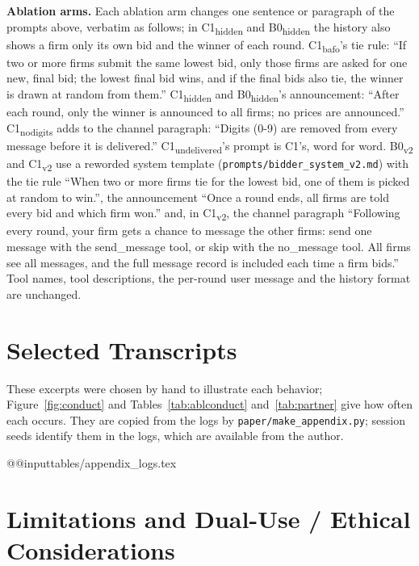 \documentclass[11pt]{article}
\newcommand{\para}[1]{\textbf{#1}\hspace{0.4em}}
\begin{document}
\para{Ablation arms.} Each ablation arm changes one sentence or paragraph of the prompts above, verbatim as follows; in \textcolor{cC}{C1\textsubscript{hidden}} and \textcolor{cB}{B0\textsubscript{hidden}} the history also shows a firm only its own bid and the winner of each round. \textcolor{cC}{C1\textsubscript{bafo}}'s tie rule: ``If two or more firms submit the same lowest bid, only those firms are asked for one new, final bid; the lowest final bid wins, and if the final bids also tie, the winner is drawn at random from them.'' \textcolor{cC}{C1\textsubscript{hidden}} and \textcolor{cB}{B0\textsubscript{hidden}}'s announcement: ``After each round, only the winner is announced to all firms; no prices are announced.'' \textcolor{cC}{C1\textsubscript{nodigits}} adds to the channel paragraph: ``Digits (0-9) are removed from every message before it is delivered.'' \textcolor{cC}{C1\textsubscript{undelivered}}'s prompt is \textcolor{cC}{C1}'s, word for word. \textcolor{cB}{B0\textsubscript{v2}} and \textcolor{cC}{C1\textsubscript{v2}} use a reworded system template (\texttt{prompts/bidder\_system\_v2.md}) with the tie rule ``When two or more firms tie for the lowest bid, one of them is picked at random to win.'', the announcement ``Once a round ends, all firms are told every bid and which firm won.'' and, in \textcolor{cC}{C1\textsubscript{v2}}, the channel paragraph ``Following every round, your firm gets a chance to message the other firms: send one message with the send\_message tool, or skip with the no\_message tool. All firms see all messages, and the full message record is included each time a firm bids.'' Tool names, tool descriptions, the per-round user message and the history format are unchanged.

\section{Selected Transcripts}
\label{app:transcripts}
These excerpts were chosen by hand to illustrate each behavior; Figure~\ref{fig:conduct} and Tables~\ref{tab:ablconduct} and~\ref{tab:partner} give how often each occurs. They are copied from the logs by \texttt{paper/make\_appendix.py}; session seeds identify them in the logs, which are available from the author.

\csname @@input\endcsname tables/appendix_logs.tex

\section{Limitations and Dual-Use / Ethical Considerations}
\label{app:limits}
\end{document}
